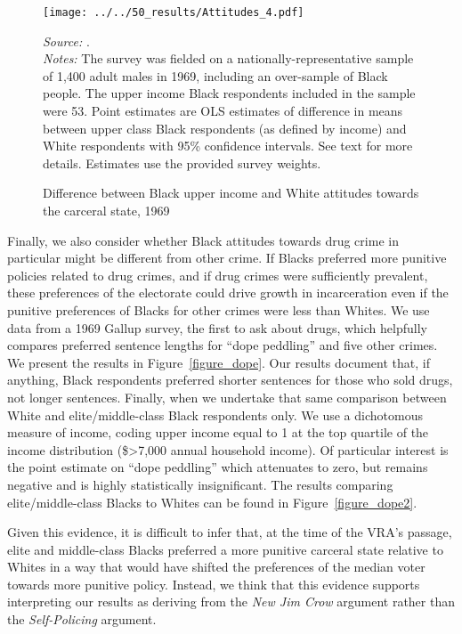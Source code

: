 \documentclass[12pt]{article}
\begin{document}
\begin{figure}[h!]
 \begin{center}
 \caption{Difference between Black upper income and White attitudes towards the carceral state, 1969}
 \small
		 \texttt{[image: ../../50\_results/Attitudes\_4.pdf]}
 \label{figure_attitudes_class2}
 	\end{center}
 	{\scriptsize{\emph{Source:} \cite{Violence1969}. }} \\
	{\scriptsize{\emph{Notes:} The survey was fielded on a nationally-representative sample of 1,400 adult males in 1969, including an over-sample of Black people.  The upper income Black respondents included in the sample were 53.   Point estimates are OLS estimates of difference in means between upper class Black respondents (as defined by income) and White respondents with 95\% confidence intervals.  See text for more details.  Estimates use the provided survey weights.  \singlespacing }}
\end{figure} \normalsize


Finally, we also consider whether Black attitudes towards drug crime in particular might be different from other crime.  If Blacks preferred more punitive policies related to drug crimes, and if drug crimes were sufficiently prevalent, these preferences of the electorate could drive growth in incarceration even if the punitive preferences of Blacks for other crimes were less than Whites.  We use data from a 1969 Gallup survey, the first to ask about drugs, which helpfully compares preferred sentence lengths for ``dope peddling'' and five other crimes.  We present the results in Figure~\ref{figure_dope}. Our results document that, if anything, Black respondents preferred shorter sentences for those who sold drugs, not longer sentences.  Finally, when we undertake that same comparison between White and elite/middle-class Black respondents only.  We use a dichotomous measure of income, coding upper income equal to 1 at the top quartile of the income distribution (\$>7,000 annual household income).  Of particular interest is the point estimate on ``dope peddling'' which attenuates to zero, but remains negative and is highly statistically insignificant.  The results comparing elite/middle-class Blacks to Whites can be found in Figure~\ref{figure_dope2}.

Given this evidence, it is difficult to infer that, at the time of the VRA's passage, elite and middle-class Blacks preferred a more punitive carceral state relative to Whites in a way that would have shifted the preferences of the median voter towards more punitive policy.  Instead, we think that this evidence supports interpreting our results as deriving from the \emph{New Jim Crow} argument rather than the \emph{Self-Policing} argument.
\end{document}
